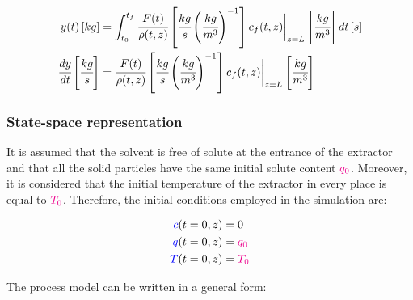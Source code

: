 \documentclass[../Article_Model_Parameters.tex]{subfiles}
\begin{document}
		{\footnotesize
			\begin{align} 
				\label{Model_measurment_1}
				y(t) \left[ kg \right] &= \int_{t_0}^{t_f} \cfrac{F(t)}{\rho(t,z)} \left[ \cfrac{kg}{s} \left( \cfrac{kg}{m^3} \right)^{-1} \right] c_f(t,z) \biggr\rvert_{z=L} \left[ \cfrac{kg}{m^3} \right] dt \left[ s \right] 	\\
				\cfrac{dy}{dt} \left[ \cfrac{kg}{s} \right] &= \cfrac{F(t)}{\rho(t,z)} \left[ \cfrac{kg}{s} \left( \cfrac{kg}{m^3} \right)^{-1} \right] c_f(t,z) \biggr\rvert_{z=L} \left[ \cfrac{kg}{m^3} \right]
                \label{Model_measurment_2}
		\end{align}	}
			
		\iffalse	
			
		\subsubsection{State-space representation} \label{CH: State_space}
		It is assumed that the solvent is free of solute at the entrance of the extractor and that all the solid particles have the same initial solute content ${\color{magenta}q_0}$. Moreover, it is considered that the initial temperature of the extractor in every place is equal to ${\color{magenta}T_0}$. Therefore, the initial conditions employed in the simulation are:
			
		{\footnotesize
			\begin{subequations}
				\begin{align*}
					{\color{blue}c}(t = 0, z) &= 0   \\
					{\color{blue}q}(t = 0, z) &= {\color{magenta}q_0} \\
					{\color{blue}T}(t = 0, z) &= {\color{magenta}T_0}
				\end{align*}
		\end{subequations} }
			
		The process model can be written in a general form:
			
\end{document}
